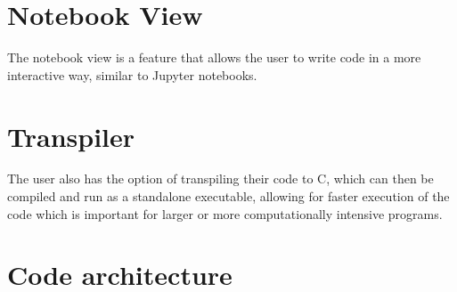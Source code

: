
\section{Notebook View}\label{sec:notebook-view}

The notebook view is a feature that allows the user to write code in a more interactive way, similar to Jupyter
notebooks\citep{Jupyter}.

\section{Transpiler}\label{sec:transpiler}

The user also has the option of transpiling their code to C, which can then be compiled and run as a standalone
executable, allowing for faster execution of the code which is important for larger or more computationally
intensive programs.

\section{Code architecture}\label{sec:code-architecture}